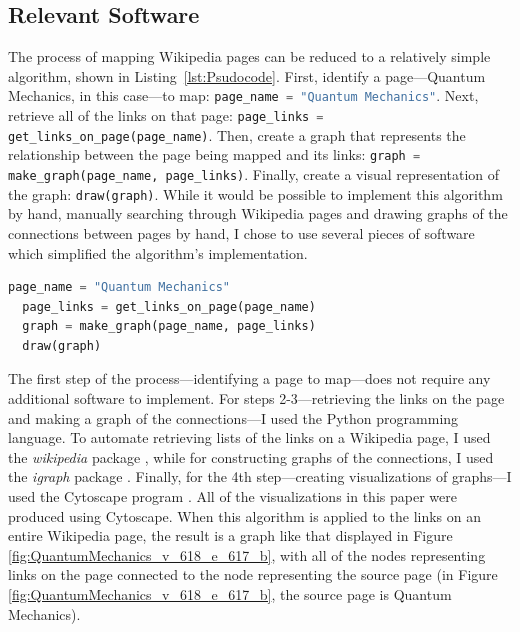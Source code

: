\documentclass[man, 12pt, floatsintext, donotrepeattitle]{apa6}
\begin{document}
\subsection{Relevant Software}
The process of mapping Wikipedia pages can be reduced to a relatively simple
algorithm, shown in Listing~\ref{lst:Psudocode}.  First, identify a
page---Quantum Mechanics, in this case---to map: \lstinline[language=Python]|page_name = "Quantum Mechanics"|. Next, retrieve all of the links on
that page: \lstinline[language=Python]|page_links = get_links_on_page(page_name)|.  Then, create a
graph that represents the relationship between the page being mapped and its
links: \lstinline[language=Python]|graph = make_graph(page_name, page_links)|.  Finally, create a
visual representation of the graph: \lstinline[language=Python]|draw(graph)|.  While it would be
possible
to implement this algorithm by hand, manually searching through Wikipedia pages
and drawing graphs of the connections between pages by hand, I chose to use several
pieces of software which simplified the algorithm's implementation.
\begin{lstlisting}[caption={Psudocode implementation of the basic mapping algorithm},label={lst:Psudocode},language=Python]
  page_name = "Quantum Mechanics"
  page_links = get_links_on_page(page_name)
  graph = make_graph(page_name, page_links)
  draw(graph)
\end{lstlisting}
The first
step of the process---identifying a page to map---does not require any
additional software to implement.  For steps 2-3---retrieving the links on the
page and making a graph of the connections---I used the Python programming
language.  To automate retrieving lists of the links on a Wikipedia page, I
used the \emph{wikipedia} package \parencite{Goldsmith2014}, while for constructing graphs of the
connections, I used the \emph{igraph} package \parencite{Csardi2006}.
Finally, for the 4th step---creating visualizations of graphs---I used the
Cytoscape program \parencite{Cytoscape}. All of the visualizations in this
paper were produced using Cytoscape.  When this algorithm is applied to the
links on an entire
Wikipedia page, the result is a graph
like that displayed in Figure \ref{fig:QuantumMechanics_v_618_e_617_b}, with
all of the nodes representing
links on the page connected to the node representing the source page (in Figure
\ref{fig:QuantumMechanics_v_618_e_617_b}, the source page is Quantum Mechanics).
\end{document}
